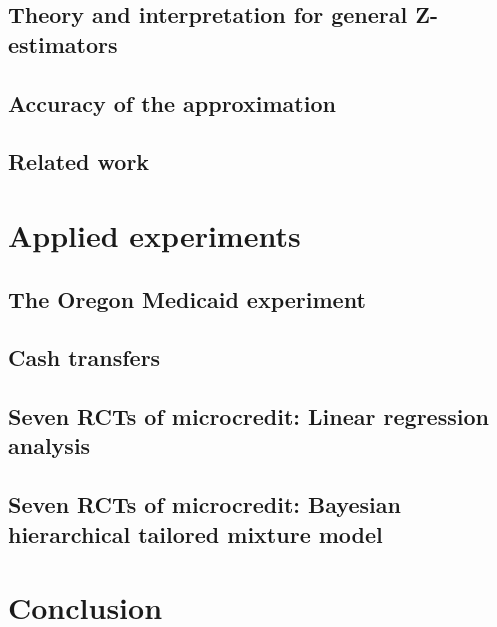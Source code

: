\documentclass[english,12pt]{article}\usepackage{lmodern} %
\theoremstyle{thmstyleone}%
\begin{document}
    \subsection{Theory and interpretation for general Z-estimators}
    

    \subsection{Accuracy of the approximation}
    

    \subsection{Related work}
    


\section{Applied experiments} 

    \subsection{The Oregon Medicaid experiment}
    

    \subsection{Cash transfers}
    

    \subsection{Seven RCTs of microcredit: Linear regression analysis}
    

    \subsection{Seven RCTs of microcredit: Bayesian hierarchical tailored mixture model}
    


\section{Conclusion}

\end{document}
